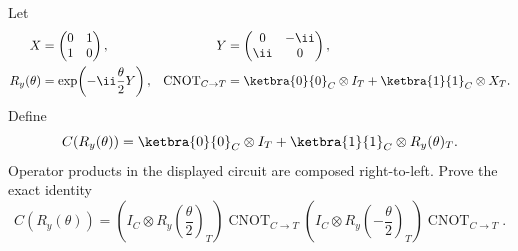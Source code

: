 Let
$$
    \begin{aligned}
    X&=\begin{pmatrix}0&1\\1&0\end{pmatrix},
    &
    Y&=\begin{pmatrix}0&-\ii\\ \ii&0\end{pmatrix},\\
    R_y(\theta)&=\exp\!\left(-\ii\frac{\theta}{2}Y\right),
    &
    \operatorname{CNOT}_{C\to T}
    &=
    \ketbra{0}{0}_C\otimes I_T
    +
    \ketbra{1}{1}_C\otimes X_T .
    \end{aligned}
$$
Define
$$
    C(R_y(\theta))
    =
    \ketbra{0}{0}_C\otimes I_T
    +
    \ketbra{1}{1}_C\otimes R_y(\theta)_T .
$$
Operator products in the displayed circuit are composed right-to-left.  Prove the exact identity
$$
    C(R_y(\theta))
    =
    \left(I_C\otimes R_y\!\left(\frac{\theta}{2}\right)_T\right)
    \operatorname{CNOT}_{C\to T}
    \left(I_C\otimes R_y\!\left(-\frac{\theta}{2}\right)_T\right)
    \operatorname{CNOT}_{C\to T}.
$$
